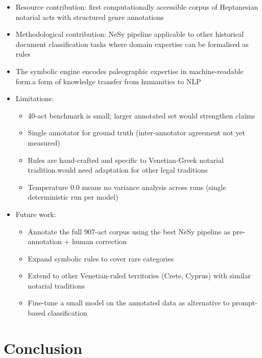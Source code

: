 \documentclass[10pt, a4paper]{article}
\begin{document}
\begin{itemize}
\item Resource contribution: first computationally accessible corpus of Heptanesian notarial acts with structured genre annotations
\item Methodological contribution: NeSy pipeline applicable to other historical document classification tasks where domain expertise can be formalised as rules
\item The symbolic engine encodes paleographic expertise in machine-readable form.a form of knowledge transfer from humanities to NLP
\item Limitations:
  \begin{itemize}
  \item 40-act benchmark is small; larger annotated set would strengthen claims
  \item Single annotator for ground truth (inter-annotator agreement not yet measured)
  \item Rules are hand-crafted and specific to Venetian-Greek notarial tradition.would need adaptation for other legal traditions
  \item Temperature 0.0 means no variance analysis across runs (single deterministic run per model)
  \end{itemize}
\item Future work:
  \begin{itemize}
  \item Annotate the full 907-act corpus using the best NeSy pipeline as pre-annotation + human correction
  \item Expand symbolic rules to cover rare categories
  \item Extend to other Venetian-ruled territories (Crete, Cyprus) with similar notarial traditions
  \item Fine-tune a small model on the annotated data as alternative to prompt-based classification
  \end{itemize}
\end{itemize}


\section{Conclusion}
\end{document}
